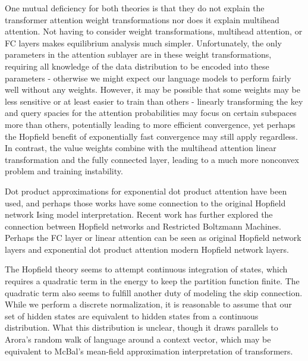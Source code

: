 \documentclass{article}
\begin{document}
One mutual deficiency for both theories is that they do not explain the transformer attention weight transformations nor does it explain multihead attention. Not having to consider weight transformations, multihead attention, or FC layers makes equilibrium analysis much simpler. Unfortunately, the only parameters in the attention sublayer are in these weight transformations, requiring all knowledge of the data distribution to be encoded into these parameters - otherwise we might expect our language models to perform fairly well without any weights. However, it may be possible that some weights may be less sensitive or at least easier to train than others - linearly transforming the key and query spacies for the attention probabilities may focus on certain subspaces more than others, potentially leading to more efficient convergence, yet perhaps the Hopfield benefit of exponentially fast convergence may still apply regardless. In contrast, the value weights combine with the multihead attention linear transformation and the fully connected layer, leading to a much more nonconvex problem and training instability.

Dot product approximations for exponential dot product attention have been used, and perhaps those works have some connection to the original Hopfield network Ising model interpretation. Recent work \cite{} has further explored the connection between Hopfield networks and Restricted Boltzmann Machines. Perhaps the FC layer or linear attention can be seen as original Hopfield network layers and exponential dot product attention modern Hopfield network layers.

The Hopfield theory seems to attempt continuous integration of states, which requires a quadratic term in the energy to keep the partition function finite. The quadratic term also seems to fulfill another duty of modeling the skip connection. While we perform a discrete normalization, it is reasonable to assume that our set of hidden states are equivalent to hidden states from a continuous distribution. What this distribution is unclear, though it draws parallels to Arora's random walk of language around a context vector, which may be equivalent to McBal's mean-field approximation interpretation of transformers.
\end{document}
